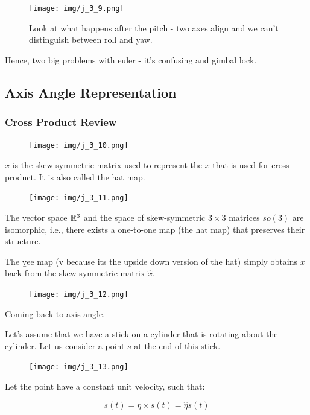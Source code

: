\begin{figure}[h]\centering\texttt{[image: img/j\_3\_9.png]}\caption{Look at what happens after the pitch - two axes align and we can't distinguish between roll and yaw.}\end{figure}

Hence, two big problems with euler - it's confusing and gimbal lock.

\subsection{Axis Angle Representation}

\subsubsection*{Cross Product Review}

\begin{figure}[h]\centering\texttt{[image: img/j\_3\_10.png]}\end{figure}

$\hat{x}$ is the skew symmetric matrix used to represent the $x$ that is used for cross product. It is also called the \b{hat map}.

\begin{figure}[h]\centering\texttt{[image: img/j\_3\_11.png]}\end{figure}

The vector space $\mathbb{R}^3$ and the space of skew-symmetric $3\times3 $ matrices $so(3)$ are isomorphic, i.e., there exists a one-to-one map (the hat map) that preserves their structure.

The \b{vee map} (v because its the upside down version of the hat) simply obtains $x$ back from the skew-symmetric matrix $\hat{x}$.

\begin{figure}[h]\centering\texttt{[image: img/j\_3\_12.png]}\end{figure}

Coming back to axis-angle. 

Let's assume that we have a stick on a cylinder that is rotating about the cylinder. Let us consider a point $s$ at the end of this stick.

\begin{figure}[h]\centering\texttt{[image: img/j\_3\_13.png]}\end{figure}

Let the point have a constant unit velocity, such that:

\begin{equation*}
    \dot{s}(t) = \eta \times s(t) = \hat{\eta} s(t)
\end{equation*}

